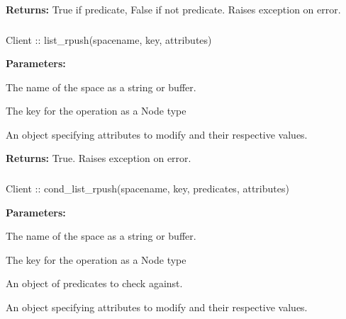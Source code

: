 \noindent\textbf{Returns:}
True if predicate, False if not predicate.  Raises exception on error.

\subsubsection{}
\label{api:nodejs:list_rpush}
\begin{javascriptcode}
Client :: list_rpush(spacename, key, attributes)
\end{javascriptcode}
\funcdesc 

\noindent\textbf{Parameters:}
\begin{description}[labelindent=\widthof{{\code{attributes}}},leftmargin=*,noitemsep,nolistsep,align=right]
\item[\code{spacename}] The name of the space as a string or buffer.
\item[\code{key}] The key for the operation as a Node type
\item[\code{attributes}] An object specifying attributes to modify and their respective values.
\end{description}

\noindent\textbf{Returns:}
True.  Raises exception on error.

\subsubsection{}
\label{api:nodejs:cond_list_rpush}
\begin{javascriptcode}
Client :: cond_list_rpush(spacename, key, predicates, attributes)
\end{javascriptcode}
\funcdesc 

\noindent\textbf{Parameters:}
\begin{description}[labelindent=\widthof{{\code{predicates}}},leftmargin=*,noitemsep,nolistsep,align=right]
\item[\code{spacename}] The name of the space as a string or buffer.
\item[\code{key}] The key for the operation as a Node type
\item[\code{predicates}] An object of predicates to check against.
\item[\code{attributes}] An object specifying attributes to modify and their respective values.
\end{description}

